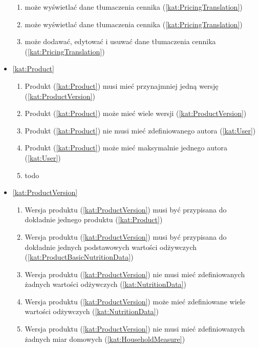 \begin{itemize}[label={\textbf{Reguły dla}}, wide, labelwidth=!, labelindent=0pt]
\begin{enumerate}[label={\textbf{REG/\protect\threedigits{\arabic{enumi}}}}, wide, labelwidth=!, align=left, leftmargin=3cm, resume]
        \item {} może wyświetlać dane tłumaczenia cennika (\ref{kat:PricingTranslation})
        \item {} może wyświetlać dane tłumaczenia cennika (\ref{kat:PricingTranslation})
        \item {} może dodawać, edytować i usuwać dane tłumaczenia cennika (\ref{kat:PricingTranslation})
    \end{enumerate}
    \item\ref{kat:Product}
    \begin{enumerate}[label={\textbf{REG/\protect\threedigits{\arabic{enumi}}}}, wide, labelwidth=!, align=left, leftmargin=3cm, resume]
        \item Produkt (\ref{kat:Product}) musi mieć przynajmniej jedną wersję (\ref{kat:ProductVersion})
        \item Produkt (\ref{kat:Product}) może mieć wiele wersji (\ref{kat:ProductVersion})
        \item Produkt (\ref{kat:Product}) nie musi mieć zdefiniowanego autora (\ref{kat:User})
        \item Produkt (\ref{kat:Product}) może mieć maksymalnie jednego autora (\ref{kat:User})
        \item todo
    \end{enumerate}
    \item\ref{kat:ProductVersion}
    \begin{enumerate}[label={\textbf{REG/\protect\threedigits{\arabic{enumi}}}}, wide, labelwidth=!, align=left, leftmargin=3cm, resume]
        \item Wersja produktu (\ref{kat:ProductVersion}) musi być przypisana do dokładnie jednego produktu  (\ref{kat:Product})
        \item Wersja produktu (\ref{kat:ProductVersion}) musi być przypisana do dokładnie jednych podstawowych wartości odżywczych (\ref{kat:ProductBasicNutritionData})
        \item Wersja produktu (\ref{kat:ProductVersion}) nie musi mieć zdefiniowanych żadnych wartości odżywczych (\ref{kat:NutritionData})
        \item Wersja produktu (\ref{kat:ProductVersion}) może mieć zdefiniowane wiele wartości odżywczych (\ref{kat:NutritionData})
        \item Wersja produktu (\ref{kat:ProductVersion}) nie musi mieć zdefiniowanych żadnych miar domowych (\ref{kat:HouseholdMeasure})

\end{enumerate}
\end{itemize}
